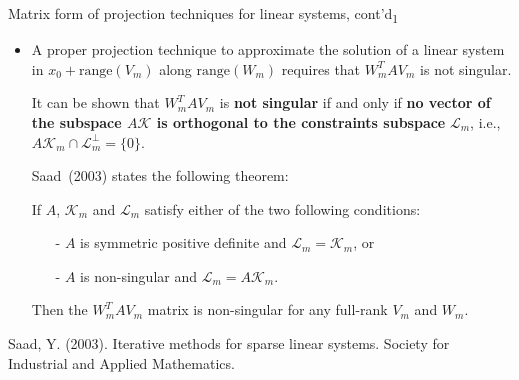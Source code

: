 \documentclass[t,usepdftitle=false]{beamer}
\begin{document}
\begin{frame}{Matrix form of projection techniques for linear systems, cont'd\textsubscript{1}}
\begin{itemize}
\item A proper projection technique to approximate the solution of a linear system in $x_0+\text{range}(V_m)$ along $\text{range}(W_m)$ requires that $W_m^TAV_m$ is not singular.
\item[] It can be shown that $W_m^TAV_m$ is \textbf{not singular} if and only if \textbf{no vector of the subspace $A\mathcal{K}$ is orthogonal to the constraints subspace} $\mathcal{L}_m$, i.e., $A\mathcal{K}_m\cap \mathcal{L}_m^\perp=\{0\}$.
\item[] Saad~(2003) states the following theorem:
\begin{theorem}
If $A$, $\mathcal{K}_m$ and $\mathcal{L}_m$ satisfy either of the two following conditions:\vspace{-.15cm}
\begin{itemize}\normalsize
\item[-] $A$ is symmetric positive definite and $\mathcal{L}_m=\mathcal{K}_m$, or\vspace{-.15cm}
\item[-] $A$ is non-singular and $\mathcal{L}_m=A\mathcal{K}_m$.\vspace{-.15cm}
\end{itemize}
Then the $W_m^TAV_m$ matrix is non-singular for any full-rank $V_m$ and $W_m$.
\end{theorem}
\end{itemize}\smallskip 
\tiny{Saad, Y. (2003). Iterative methods for sparse linear systems. Society for Industrial and Applied Mathematics.}
\end{frame}
\end{document}
